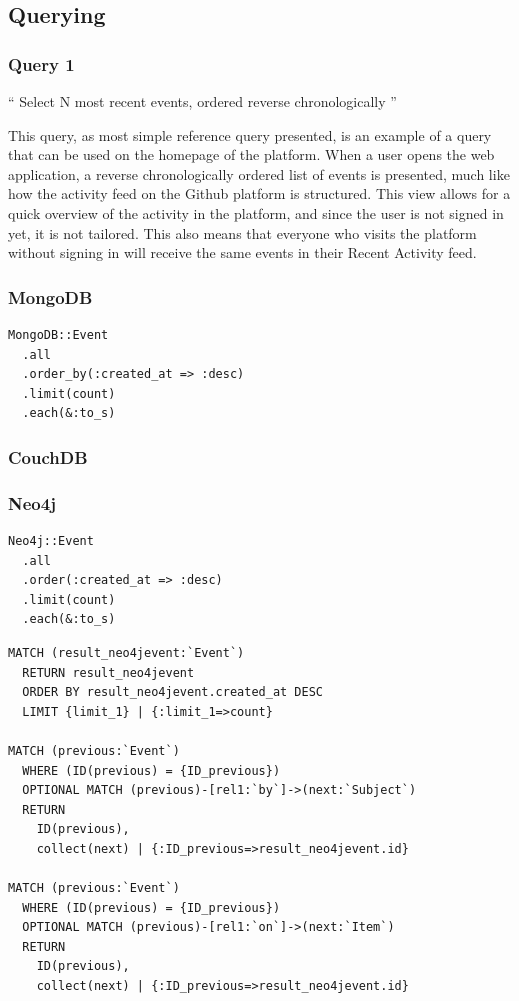 \subsection{Querying}
\label{subsec:querying}

\subsubsection{Query 1}
\label{subsubsec:query-1}

``
Select N most recent events, ordered reverse chronologically
''

This query, as most simple reference query presented, is an example of a query that can be used on the homepage of the platform.
When a user opens the web application, a reverse chronologically ordered list of events is presented, much like how the activity feed on the Github platform is structured.
This view allows for a quick overview of the activity in the platform, and since the user is not signed in yet, it is not tailored.
This also means that everyone who visits the platform without signing in will receive the same events in their Recent Activity feed.

\subsubsection*{MongoDB}

\begin{verbatim}
MongoDB::Event
  .all
  .order_by(:created_at => :desc)
  .limit(count)
  .each(&:to_s)
\end{verbatim}

\subsubsection*{CouchDB}


\subsubsection*{Neo4j}

\begin{verbatim}
Neo4j::Event
  .all
  .order(:created_at => :desc)
  .limit(count)
  .each(&:to_s)
\end{verbatim}

\begin{verbatim}
MATCH (result_neo4jevent:`Event`)
  RETURN result_neo4jevent
  ORDER BY result_neo4jevent.created_at DESC
  LIMIT {limit_1} | {:limit_1=>count}

MATCH (previous:`Event`)
  WHERE (ID(previous) = {ID_previous})
  OPTIONAL MATCH (previous)-[rel1:`by`]->(next:`Subject`)
  RETURN
    ID(previous),
    collect(next) | {:ID_previous=>result_neo4jevent.id}

MATCH (previous:`Event`)
  WHERE (ID(previous) = {ID_previous})
  OPTIONAL MATCH (previous)-[rel1:`on`]->(next:`Item`)
  RETURN
    ID(previous),
    collect(next) | {:ID_previous=>result_neo4jevent.id}
\end{verbatim}

